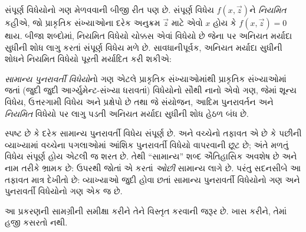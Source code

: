 \begingroup
\makeatletter{}\makeatother

\label{guunit:OLP-0227}


સંપૂર્ણ વિધેયોનો ગણ મેળવવાની બીજી રીત પણ છે. સંપૂર્ણ વિધેય
$f(x,\vec z)$ને \emph{નિયમિત} કહીએ, જો પ્રાકૃતિક સંખ્યાઓના દરેક
અનુક્રમ $\vec z$ માટે એવો $x$ હોય કે $f(x,\vec z) = 0$ થાય.
બીજા શબ્દોમાં, નિયમિત વિધેયો ચોક્કસ એવાં વિધેયો છે જેના પર
અનિયત મર્યાદા સુધીની શોધ લાગુ કરતાં સંપૂર્ણ વિધેય મળે છે.
સાવધાનીપૂર્વક, અનિયત મર્યાદા સુધીની શોધને નિયમિત વિધેયો પૂરતી
મર્યાદિત કરી શકીએ:

\begin{defn}
\emph{સામાન્ય પુનરાવર્તી વિધેયો}નો ગણ એટલે પ્રાકૃતિક
સંખ્યાઓમાંથી પ્રાકૃતિક સંખ્યાઓમાં જતાં (જુદી જુદી
આર્ગ્યુમેન્ટ-સંખ્યા ધરાવતાં) વિધેયોનો સૌથી નાનો એવો ગણ, જેમાં
શૂન્ય વિધેય, ઉત્તરગામી વિધેય અને પ્રક્ષેપો છે તથા જે સંયોજન,
આદિમ પુનરાવર્તન અને \emph{નિયમિત} વિધેયો પર લાગુ પડતી અનિયત
મર્યાદા સુધીની શોધ હેઠળ બંધ છે.
\end{defn}

સ્પષ્ટ છે કે દરેક સામાન્ય પુનરાવર્તી વિધેય સંપૂર્ણ છે.
 અને
 વચ્ચેનો તફાવત એ છે કે પછીની
વ્યાખ્યામાં વચ્ચેના પગલાઓમાં આંશિક પુનરાવર્તી વિધેયો વાપરવાની
છૂટ છે; અંતે મળતું વિધેય સંપૂર્ણ હોય એટલી જ શરત છે. તેથી
``સામાન્ય'' શબ્દ ઐતિહાસિક અવશેષ છે અને નામ તરીકે ભ્રામક છે:
ઉપરથી જોતાં  એ
 કરતાં \emph{ઓછી} સામાન્ય લાગે છે.
પરંતુ સદનસીબે આ તફાવત માત્ર દેખીતો છે: વ્યાખ્યાઓ જુદી હોવા
છતાં સામાન્ય પુનરાવર્તી વિધેયોનો ગણ અને પુનરાવર્તી વિધેયોનો
ગણ એક જ છે.
\endgroup


\OLEndChapterHook
\endgroup


\begingroup
\makeatletter{}\makeatother

\label{guunit:OLP-0228}


\begin{editorial}
  આ પ્રકરણની સામગ્રીની સમીક્ષા કરીને તેને વિસ્તૃત કરવાની જરૂર છે.
  ખાસ કરીને, તેમાં હજી કસરતો નથી.
\end{editorial}

\begingroup
\makeatletter{}\makeatother

\label{guunit:OLP-0229}


